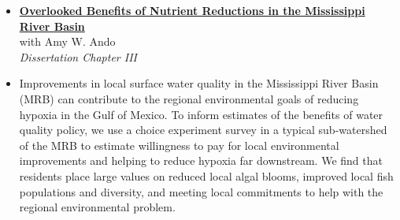 \documentclass[11pt]{article}
\newenvironment{abstracts}[2]{%
  \begin{list}{}{%
    \setlength{\topsep}{0pt}%
    \setlength{\leftmargin}{#1}%
    \setlength{\rightmargin}{#2}%
    \setlength{\listparindent}{\parindent}%
    \setlength{\itemindent}{\parindent}%
    \setlength{\parsep}{\parskip}%
  }%
  \item[]}{\end{list}}
\begin{document}
\begin{abstracts}{-1.5in}{0in}
{\begin{itemize}
    \item[] \href{https://bryanparthum.s3.us-east-2.amazonaws.com/Parthum_Ando_2019.pdf}
    {\textbf{Overlooked Benefits of Nutrient Reductions in the Mississippi River Basin}} \\
    with Amy W. Ando \\
    \textit{Dissertation Chapter III}
    \item[] Improvements in local surface water quality in the Mississippi River Basin (MRB) can contribute to the regional environmental goals of reducing hypoxia in the Gulf of Mexico. To inform estimates of the benefits of water quality policy, we use a choice experiment survey in a typical sub-watershed of the MRB to estimate willingness to pay for local environmental improvements and helping to reduce hypoxia far downstream. We find that residents place large values on reduced local algal blooms, improved local fish populations and diversity, and meeting local commitments to help with the regional environmental problem.
    
    \vfill

\end{itemize}
}
\end{abstracts}

\end{document}
